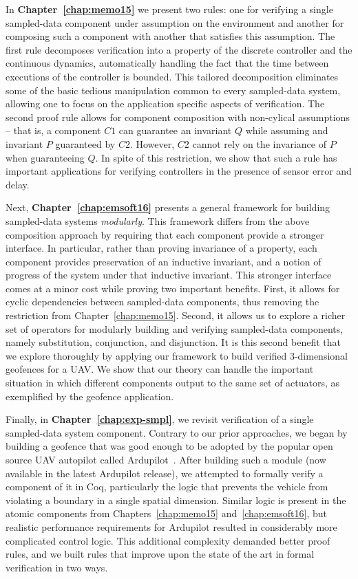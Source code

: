 \documentclass[12pt]{ucsddissertation}
\begin{document}
\begin{dissertationintroduction}
In \textbf{Chapter~\ref{chap:memo15}} we present two rules: one for
verifying a single sampled-data component under assumption on the
environment and another for composing such a component with another that
satisfies this assumption. The first rule decomposes verification into a
property of the discrete controller and the continuous dynamics,
automatically handling the fact that the time between executions of the
controller is bounded. This tailored decomposition eliminates some of the
basic tedious manipulation common to every sampled-data system, allowing
one to focus on the application specific aspects of verification. The
second proof rule allows for component composition with non-cylical
assumptions -- that is, a component $C1$ can guarantee an invariant $Q$
while assuming and invariant $P$ guaranteed by $C2$. However, $C2$ cannot
rely on the invariance of $P$ when guaranteeing $Q$. In spite of this
restriction, we show that such a rule has important applications for
verifying controllers in the presence of sensor error and delay.

Next, \textbf{Chapter~\ref{chap:emsoft16}} presents a general framework for
building sampled-data systems \emph{modularly}. This framework differs from
the above composition approach by requiring that each component provide a
stronger interface. In particular, rather than proving invariance of a
property, each component provides preservation of an inductive invariant,
and a notion of progress of the system under that inductive invariant. This
stronger interface comes at a minor cost while proving two important
benefits. First, it allows for cyclic dependencies between sampled-data
components, thus removing the restriction from
Chapter~\ref{chap:memo15}. Second, it allows us to explore a richer set of
operators for modularly building and verifying sampled-data components,
namely substitution, conjunction, and disjunction. It is this second
benefit that we explore thoroughly by applying our framework to build
verified 3-dimensional geofences for a UAV. We show that our theory can
handle the important situation in which different components output to the
same set of actuators, as exemplified by the geofence application.

Finally, in \textbf{Chapter~\ref{chap:exp-smpl}}, we revisit verification
of a single sampled-data system component. Contrary to our prior
approaches, we began by building a geofence that was good enough to be
adopted by the popular open source UAV autopilot called
Ardupilot~\cite{???}. After building such a module (now available in the
latest Ardupilot release), we attempted to formally verify a component of
it in Coq, particularly the logic that prevents the vehicle from violating
a boundary in a single spatial dimension. Similar logic is present in the
atomic components from Chapters~\ref{chap:memo15} and~\ref{chap:emsoft16},
but realistic performance requirements for Ardupilot resulted in
considerably more complicated control logic. This additional complexity
demanded better proof rules, and we built rules that improve upon the state
of the art in formal verification in two ways.


\end{dissertationintroduction}
\end{document}
